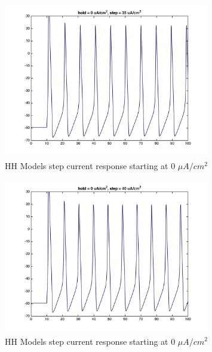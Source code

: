 \documentclass{beamer}
\begin{document}
\begin{frame}
  \begin{figure}
    \centering
    \includegraphics[width = 0.8\textwidth]{./images/current_0_35.jpg}
    \caption{HH Models step current response starting at 0 $\mu A/cm^2$}
  \end{figure}
\end{frame}

\begin{frame}
  \begin{figure}
    \centering
    \includegraphics[width = 0.8\textwidth]{./images/current_0_40.jpg}
    \caption{HH Models step current response starting at 0 $\mu A/cm^2$}
  \end{figure}
\end{frame}
\end{document}
